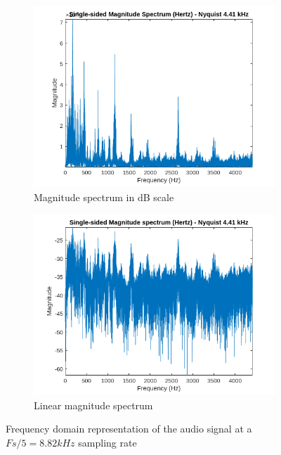 \documentclass[12pt]{article}
\newcommand{\code}[1]{\colorbox{gray!20}{\texttt{#1}}}
\begin{document}
\begin{figure}[htbp]
  \centering
  \begin{subfigure}[b]{0.48\textwidth} %
    \includegraphics[width=\linewidth]{labs/lab1/lab-report-tex/figures/figure_7.png}
    \caption{Magnitude spectrum in dB scale}
    \label{fig:f2}
  \end{subfigure}
  \begin{subfigure}[b]{0.48\textwidth} %
    \includegraphics[width=\linewidth]{labs/lab1/lab-report-tex/figures/figure_8.png}
    \caption{Linear magnitude spectrum}
    \label{fig:f2}
  \end{subfigure}
  \caption{Frequency domain representation of the audio signal at a \code{$Fs/5 = 8.82kHz$} sampling rate}
\end{figure}
\end{document}

